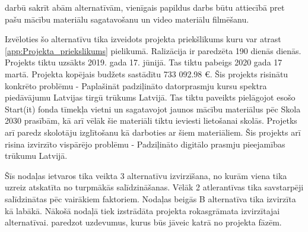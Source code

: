darbū sakrīt abām alternatīvām, vienīgais papildus darbs būtu attiecībā pret pašu mācību materiālu
sagatavošanu un video materiālu filmēšanu.
\par
Izvēloties šo alternatīvu tika izveidots projekta priekšlikums kuru var atrast \ref{app:Projekta_priekslikums}
pielikumā. Ralizācija ir paredzēta 190 dienās %
dienās. Projekts tiktu uzsākts 2019. gada 17. jūnijā. Tas tiktu pabeigs 2020 gada 17 martā. Projekta kopējais
budžets sastādītu 733 092.98 €. Šis projekts risinātu konkrēto problēmu - Paplašināt padziļināto datorprasmju 
kursu spektra piedāvājumu Latvijas tirgū
trūkums Latvijā. Tas tiktu paveikts pielāgojot esošo Start(it) fonda tīmekļa vietni un sagatavojot jaunos 
mācību materiālus pēc Skola 2030 prasībām, kā arī vēlāk šie materiāli tiktu ieviesti lietošanai skolās.
Projetks arī paredz skolotāju izglītošanu kā darboties ar šiem materiāliem. Šis projekts arī risina 
izvirzīto vispārējo problēmu - Padziļināto digitālo prasmju pieejamības trūkumu Latvijā.
\par
Šīs nodaļas ietvaros tika veikta 3 alternatīvu izvirzīšana, no kurām viena tika uzreiz atskatīta no 
turpmākās salīdzināšanas. Vēlāk 2 atlerantīvas tika savstarpēji salīdzinātas pēc vairākiem faktoriem.
Nodaļas beigās B alternatīva tika izvirzīta kā labākā. Nākošā nodaļā tiek izstrādāta projekta rokasgrāmata
izvirzītajai alternatīvai. paredzot uzdevumus, kurus būs jāveic katrā no projekta fāzēm.